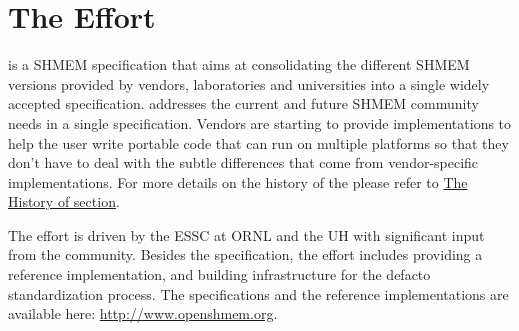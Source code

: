 
\section{The \openshmem Effort}

\openshmem is a SHMEM specification that aims at consolidating the different
SHMEM versions provided by vendors, laboratories and universities 
into a single widely accepted specification. \openshmem addresses the
current and future SHMEM community needs in a single specification. Vendors are starting to provide \openshmem implementations to help the user
write portable \openshmem code that can run on multiple platforms  so that they don't have to deal with the
subtle differences that come from vendor-specific implementations. For more details on the history of 
the \openshmem please refer to \hyperref[sec:openshmem_history]{The History of \openshmem section}.  

The \openshmem effort is driven by the \ac{ESSC} at \ac{ORNL} and the \ac{UH} 
with significant input from the \openshmem{} community. Besides the
specification, the effort includes providing a reference implementation,
and building infrastructure for the defacto standardization process.
The specifications and the reference implementations are available here: 
\url{http://www.openshmem.org}. 


